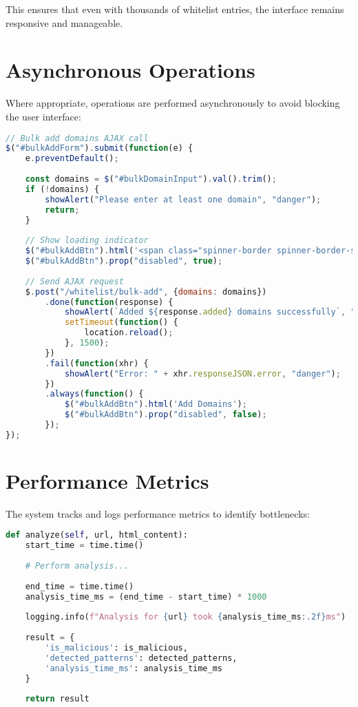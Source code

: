 This ensures that even with thousands of whitelist entries, the interface remains responsive and manageable.

\section{Asynchronous Operations}

Where appropriate, operations are performed asynchronously to avoid blocking the user interface:

\begin{lstlisting}[language=JavaScript, caption=Asynchronous AJAX Operations]
// Bulk add domains AJAX call
$("#bulkAddForm").submit(function(e) {
    e.preventDefault();
    
    const domains = $("#bulkDomainInput").val().trim();
    if (!domains) {
        showAlert("Please enter at least one domain", "danger");
        return;
    }
    
    // Show loading indicator
    $("#bulkAddBtn").html('<span class="spinner-border spinner-border-sm"></span> Adding...');
    $("#bulkAddBtn").prop("disabled", true);
    
    // Send AJAX request
    $.post("/whitelist/bulk-add", {domains: domains})
        .done(function(response) {
            showAlert(`Added ${response.added} domains successfully`, "success");
            setTimeout(function() {
                location.reload();
            }, 1500);
        })
        .fail(function(xhr) {
            showAlert("Error: " + xhr.responseJSON.error, "danger");
        })
        .always(function() {
            $("#bulkAddBtn").html('Add Domains');
            $("#bulkAddBtn").prop("disabled", false);
        });
});
\end{lstlisting}

\section{Performance Metrics}

The system tracks and logs performance metrics to identify bottlenecks:

\begin{lstlisting}[language=Python, caption=Performance Metrics Logging]
def analyze(self, url, html_content):
    start_time = time.time()
    
    # Perform analysis...
    
    end_time = time.time()
    analysis_time_ms = (end_time - start_time) * 1000
    
    logging.info(f"Analysis for {url} took {analysis_time_ms:.2f}ms")
    
    result = {
        'is_malicious': is_malicious,
        'detected_patterns': detected_patterns,
        'analysis_time_ms': analysis_time_ms
    }
    
    return result
\end{lstlisting}

